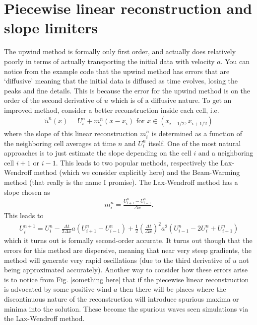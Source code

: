 \section{Piecewise linear reconstruction and slope limiters}
The upwind method is formally only first order, and actually does relatively poorly in terms of actually transporting the initial data with velocity $a$.  You can notice from the example code that the upwind method has errors that are `diffusive' meaning that the initial data is diffused as time evolves, losing the peaks and fine details.  This is because the error for the upwind method is on the order of the second derivative of $u$ which is of a diffusive nature.  To get an improved method, consider a better reconstruction inside each cell, i.e.
\begin{gather}
\tilde{u}^n(x) = U_i^n + m_i^n(x-x_i) \mbox{ for } x \in (x_{i-1/2},x_{i+1/2})
\end{gather}
where the slope of this linear reconstruction $m_i^n$ is determined as a function of the neighboring cell averages at time $n$ and $U_i^n$ itself.  One of the most natural approaches is to just estimate the slope depending on the cell $i$ and a neighboring cell $i+1$ or $i-1$.  This leads to two popular methods, respectively the Lax-Wendroff method (which we consider explicitly here) and the Beam-Warming method (that really is the name I promise).  The Lax-Wendroff method has a slope chosen as
\begin{gather}
m_i^n = \frac{U^n_{i+1}-U_{i-1}^n}{\Delta x}.
\end{gather}
This leads to
\begin{gather}
U_i^{n+1} = U_i^n - \frac{\Delta t}{2\Delta x} a \left(U_{i+1}^n-U_{i-1}^n\right) + \frac{1}{2}\left(\frac{\Delta t}{\Delta x}\right)^2 a^2 \left(U_{i-1}^n - 2U_i^n+U_{i+1}^n\right)
\end{gather}
which it turns out is formally second-order accurate.  It turns out though that the errors for this method are dispersive, meaning that near very steep gradients, the method will generate very rapid oscillations (due to the third derivative of $u$ not being approximated accurately).  Another way to consider how these errors arise is to notice from Fig. \ref{something here} that if the piecewise linear reconstruction is advocated by some positive wind $a$ then there will be places where the discontinuous nature of the reconstruction will introduce spurious maxima or minima into the solution.  These become the spurious waves seen simulations via the Lax-Wendroff method.

